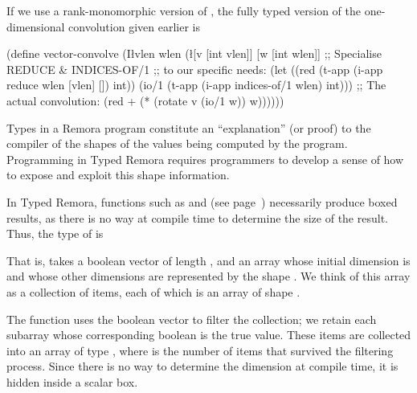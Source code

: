 If we use a rank-monomorphic version of ,
the fully typed version of the one-dimensional convolution given earlier is
\begin{code}
(define vector-convolve
  (I\l{vlen wlen}
    (\l{[v [int vlen]] [w [int wlen]]}
      ;; Specialise REDUCE & INDICES-OF/1
      ;; to our specific needs:
      (let ((red  (t-app (i-app reduce wlen [vlen] [])
                         int))
            (io/1 (t-app (i-app indices-of/1 wlen)
                         int)))
        ;; The actual convolution:
        (red + (* (rotate v (io/1 w)) w))))))\end{code}

Types in a Remora program constitute an ``explanation'' (or proof) to the
compiler of the shapes of the values being computed by the program.
Programming in Typed Remora requires programmers to develop a
sense of how to expose and exploit this shape information.


In Typed Remora, functions such as  and 
(see page~\pageref{sec:conditional-code})
necessarily produce boxed results,
as there is no way at compile time to determine the size of the result.
Thus, the type of  is
\begin{code}
\end{code}
That is,  takes a boolean vector of length ,
and an array whose initial dimension is  and whose other
dimensions are represented by the shape .
We think of this array as a collection of  items,
each of which is an array of shape .

The function uses the boolean vector to filter the collection;
we retain each subarray whose corresponding boolean is the true value.
These items are collected into an array of type \ex{[t db @s]}, 
where  is the number of items that survived the filtering
process.
Since there is no way to determine the dimension  at compile time,
it is hidden inside a scalar box.

